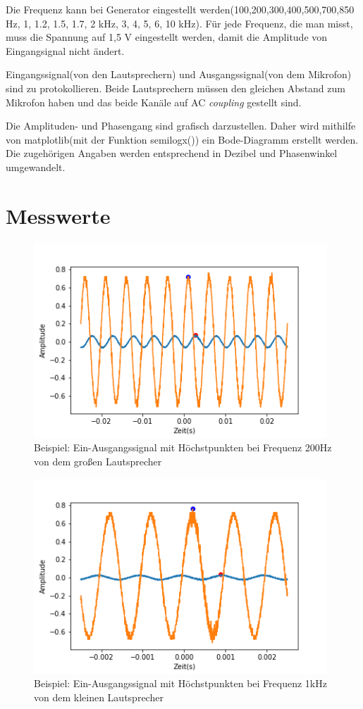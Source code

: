 \documentclass[12pt, oneside, a4paper, \docLanguage]{report}
\begin{document}
Die Frequenz kann bei Generator eingestellt werden(100,200,300,400,500,700,850 Hz, 1, 1.2, 1.5, 1.7, 2 kHz, 3, 4, 5, 6, 10 kHz). Für jede Frequenz, die man misst, muss die Spannung auf 1,5 V eingestellt werden, damit die Amplitude von Eingangsignal nicht ändert.

Eingangssignal(von den Lautsprechern) und Ausgangssignal(von dem Mikrofon) sind zu protokollieren. Beide Lautsprechern müssen den gleichen Abstand zum Mikrofon haben und das beide Kanäle auf AC \textit{coupling} gestellt sind.

Die Amplituden- und Phasengang sind grafisch darzustellen. Daher wird mithilfe von matplotlib(mit der Funktion semilogx()) ein Bode-Diagramm erstellt werden. Die zugehörigen Angaben werden entsprechend in Dezibel und Phasenwinkel umgewandelt.

\section{Messwerte}
\label{chap:VERSUCH_2_MESSWERTE}
\begin{figure}[H]
	\centering\small
	\includegraphics[width=11cm]{gross200Hz.png}
	\caption{Beispiel: Ein-Ausgangssignal mit Höchstpunkten bei Frequenz 200Hz von dem großen Lautsprecher}
\end{figure}
\begin{figure}[H]
	\centering\small
	\includegraphics[width=11cm]{gross1000Hzk.png}
	\caption{Beispiel: Ein-Ausgangssignal mit Höchstpunkten bei Frequenz 1kHz von dem kleinen Lautsprecher}
\end{figure}
\end{document}
